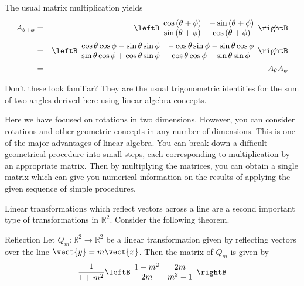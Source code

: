 \begin{solution}
The usual matrix multiplication 
yields
\begin{eqnarray*}
A_{\theta +\phi } &=& \leftB
\begin{array}{cc}
\cos \left( \theta +\phi \right) & -\sin \left( \theta +\phi \right) \\
\sin \left( \theta +\phi \right) & \cos \left( \theta +\phi \right)
\end{array}
\rightB \\
&=&\leftB
\begin{array}{cc}
\cos \theta \cos \phi -\sin \theta \sin \phi & -\cos \theta \sin \phi -\sin
\theta \cos \phi \\
\sin \theta \cos \phi +\cos \theta \sin \phi & \cos \theta \cos \phi -\sin
\theta \sin \phi
\end{array}
\rightB \\
&=& A_{\theta }A_{\phi } 
\end{eqnarray*}

Don't these look familiar? They are the usual trigonometric identities for the sum
of two angles derived here using linear algebra concepts.

\end{solution}

Here we have focused on rotations in two dimensions. However, you can consider rotations and
other geometric concepts in any number of dimensions. This is one of the
major advantages of linear algebra. You can break down a difficult
geometrical procedure into small steps, each corresponding to multiplication
by an appropriate matrix. Then by multiplying the matrices, you can obtain a
single matrix which can give you numerical information on the results of
applying the given sequence of simple procedures.

Linear transformations which reflect vectors across a line are a second important type of transformations in $\mathbb{R}^2$. Consider the following theorem.

\begin{theorem}{Reflection}\label{thm:reflection}
Let $Q_m: \mathbb{R}^2 \to \mathbb{R}^2$ be a linear transformation given by reflecting vectors over the line $\vect{y}=m\vect{x}$. Then the matrix of $Q_m$ is given by 
\[
\frac{1}{1+m^2}
\leftB
\begin{array}{cc}
1-m^2 & 2m \\
2m & m^2-1 
\end{array}
\rightB
\]
\end{theorem}

